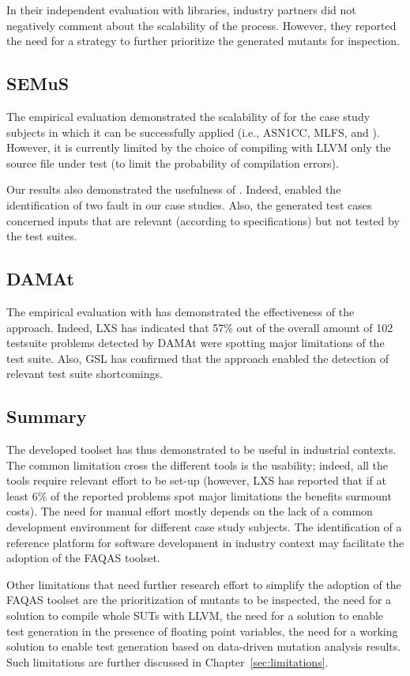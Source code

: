 In their independent evaluation with libraries, industry partners did not negatively comment about the scalability of the process. However, they reported the need for a strategy to further prioritize the generated mutants for inspection.

\subsection*{SEMuS}

The empirical evaluation demonstrated the scalability of \SEMUS for the case study subjects in which it can be successfully applied (i.e., ASN1CC, MLFS, and \UTIL). However, it is currently limited by the choice of compiling with LLVM only the source file under test (to limit the probability of compilation errors).

Our results also demonstrated the usefulness of \SEMUS. Indeed, \SEMUS enabled the identification of two fault in our case studies. Also, the generated test cases concerned inputs that are relevant (according to specifications) but not tested by the test suites.


\subsection*{DAMAt}

The empirical evaluation with \ESAIL has demonstrated the effectiveness of the approach. Indeed, LXS has indicated that 57\% out of the overall amount of 102 testsuite problems detected by DAMAt were spotting major limitations of the test suite. Also, GSL has confirmed that the approach enabled the detection of relevant test suite shortcomings.


\subsection*{Summary}

The developed toolset has thus demonstrated to be useful in industrial contexts. The common limitation cross the different tools is the usability; indeed, all the tools require relevant effort to be set-up (however, LXS has reported that if at least 6\% of the reported problems spot major limitations the benefits surmount costs). The need for manual effort mostly depends on the lack of a common development environment for different case study subjects. The identification of a reference platform for software development in industry context may facilitate the adoption of the FAQAS toolset.

Other limitations that need further research effort to simplify the adoption of the FAQAS toolset are the prioritization of mutants to be inspected, the need for a solution to compile whole SUTs with LLVM, the need for a solution to enable test generation in the presence of floating point variables, the need for a working solution to enable test generation based on data-driven mutation analysis results. Such limitations are further discussed in Chapter~\ref{sec:limitations}.